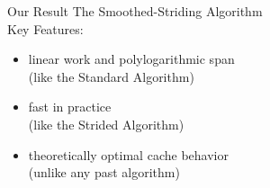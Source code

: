 \documentclass[xcolor=x11names, svgnames, rgb]{beamer}
\begin{document}
\begin{frame}[t]{Our Result}
	\vspace{0.15cm}
	{\Large The Smoothed-Striding Algorithm\\}
	\vspace{0.5cm}
	Key Features:
	\begin{itemize}
		\item linear work and polylogarithmic span \\
			{\color{blue} (like the Standard Algorithm)\\}
		\vspace{0.15cm}
		\item fast in practice \\
			{\color{blue} (like the Strided Algorithm)\\}
	\vspace{0.15cm}
		\item theoretically optimal cache behavior \\
			{\color{blue} (unlike any past algorithm)}
	\end{itemize}
\end{frame}

\end{document}
